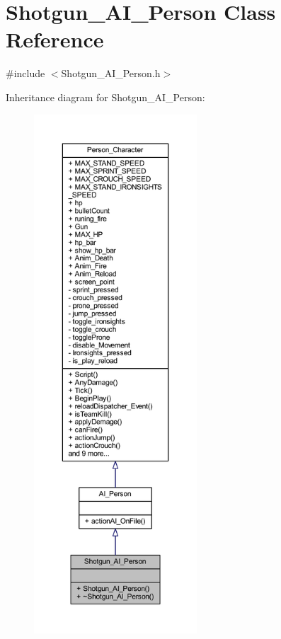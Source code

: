 \hypertarget{class_shotgun___a_i___person}{}\section{Shotgun\+\_\+\+A\+I\+\_\+\+Person Class Reference}
\label{class_shotgun___a_i___person}


{\ttfamily \#include $<$Shotgun\+\_\+\+A\+I\+\_\+\+Person.\+h$>$}



Inheritance diagram for Shotgun\+\_\+\+A\+I\+\_\+\+Person\+:\nopagebreak
\begin{figure}[H]
\begin{center}
\leavevmode
\includegraphics[height=550pt]{class_shotgun___a_i___person__inherit__graph}
\end{center}
\end{figure}


